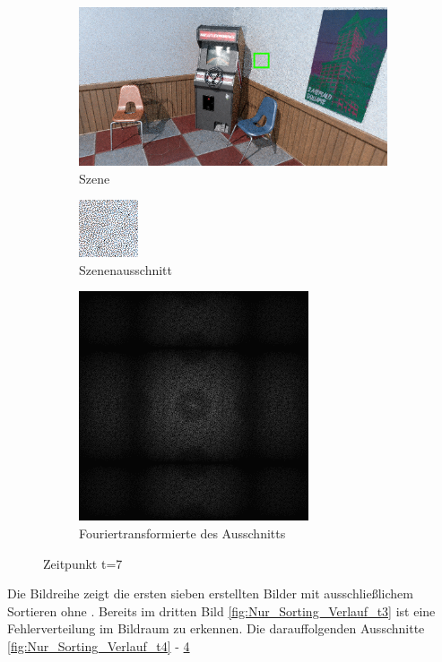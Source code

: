 \begin{figure}[H]
    \begin{subfigure}{\textwidth}   
        \centering \includegraphics[scale=.25]{content/TemporalerAlg/Bilder/Sorting/Szene/Szene7.png}
        \caption{Szene}
        \label{fig:Nur_Sorting_Szene_t7}
    \end{subfigure}
    \begin{subfigure}{0.5\textwidth}
        \centering\includegraphics[width=0.4\linewidth]{content/TemporalerAlg/Bilder/Sorting/Ausschnitte/Ausschnitt7.png} 
        \caption{Szenenausschnitt}
        \label{fig:Nur_Sorting_ausschnitt_t7}
    \end{subfigure}
    \begin{subfigure}{0.5\textwidth}
        \centering\includegraphics[width=0.4\linewidth]{content/TemporalerAlg/Bilder/Sorting/Spektren/Ausschnitt7.png}
        \caption{Fouriertransformierte des Ausschnitts}
        \label{fig:Nur_Sorting_Fouriertransformierte_t7}
    \end{subfigure}
        \caption{Zeitpunkt t=7}
        \label{fig:Nur_Sorting_Verlauf_t7}
\end{figure}

Die Bildreihe zeigt die ersten sieben erstellten Bilder mit ausschließlichem 
Sortieren ohne . Bereits im dritten Bild 
\ref{fig:Nur_Sorting_Verlauf_t3} ist eine 
Fehlerverteilung im Bildraum zu erkennen. Die darauffolgenden Ausschnitte 
\ref{fig:Nur_Sorting_Verlauf_t4} - \ref{fig:Nur_Sorting_Verlauf_t7}